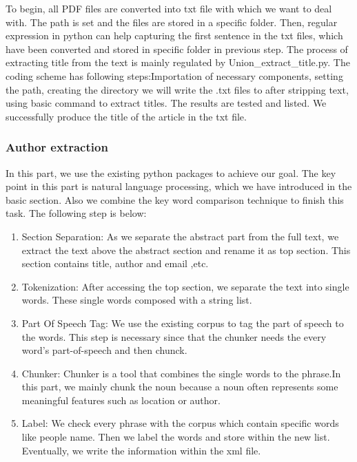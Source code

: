 To begin, all PDF files are converted into txt file with which we want to deal with. 
The path is set and the files are stored in a specific folder. 
Then, regular expression in python can help capturing the first sentence in the txt files, which have been converted and stored in specific folder in previous step. 
The process of extracting title from the text is mainly regulated by Union\_extract\_title.py. 
The coding scheme has following steps:Importation of necessary components, setting the path, creating the directory we will write the .txt files to after stripping text, using basic command to extract titles. The results are tested and listed. We successfully produce the title of the article in the txt file. 

\subsubsection{Author extraction}

In this part, we use the existing python packages to achieve our goal.
The key point in this part is natural language processing,  which we have introduced in the basic section. Also we combine the key word comparison technique to finish this task. The following step is below:

\begin{enumerate}
	
	\item Section Separation: As we separate the abstract part from the full text, we extract the text above the 
	abstract section and rename it as top section. 
	This section contains title, author and email ,etc.
	\item Tokenization: After accessing the top section, we separate the text into single words. 
	These single words composed with a string list. 
	\item Part Of Speech Tag: We use the existing corpus to tag the part of speech to the words. 
	This step is necessary since that the chunker needs the every word's part-of-speech and then chunck.
	\item Chunker: Chunker is a tool that combines the single words to the phrase.In this part, we mainly chunk the noun because a noun often represents some meaningful features 
	such as location or author.
	\item Label: We check every phrase with the corpus which contain specific words like people name. 
	Then we label the words and store within the new list. 
	Eventually, we write the information within the xml file. 
	
\end{enumerate}

